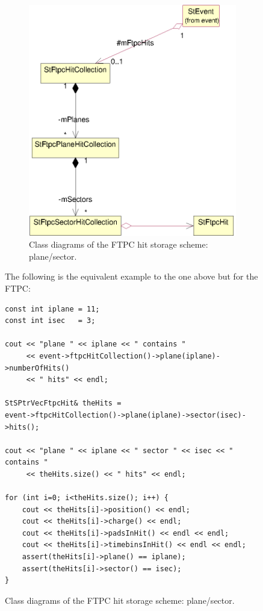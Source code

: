 \documentclass[twoside]{article}
\begin{document}
\begin{figure}[htb]
\begin{center}
\begin{figure}[htb]
    \begin{center}
        \includegraphics{ftpc.eps}
        \caption{Class diagrams of the FTPC hit storage scheme: plane/sector.}
        \label{fig:ftpc}
    \end{center}
\end{figure}
The following is the equivalent example to the one above but for the FTPC:
\begin{verbatim}
const int iplane = 11;
const int isec   = 3;

cout << "plane " << iplane << " contains "
     << event->ftpcHitCollection()->plane(iplane)->numberOfHits()
     << " hits" << endl;

StSPtrVecFtpcHit& theHits =
event->ftpcHitCollection()->plane(iplane)->sector(isec)->hits();

cout << "plane " << iplane << " sector " << isec << " contains "
     << theHits.size() << " hits" << endl;

for (int i=0; i<theHits.size(); i++) {
    cout << theHits[i]->position() << endl;
    cout << theHits[i]->charge() << endl;
    cout << theHits[i]->padsInHit() << endl << endl;
    cout << theHits[i]->timebinsInHit() << endl << endl;
    assert(theHits[i]->plane() == iplane);
    assert(theHits[i]->sector() == isec);
}
\end{verbatim}


\end{center}
\end{figure}
\end{document}
